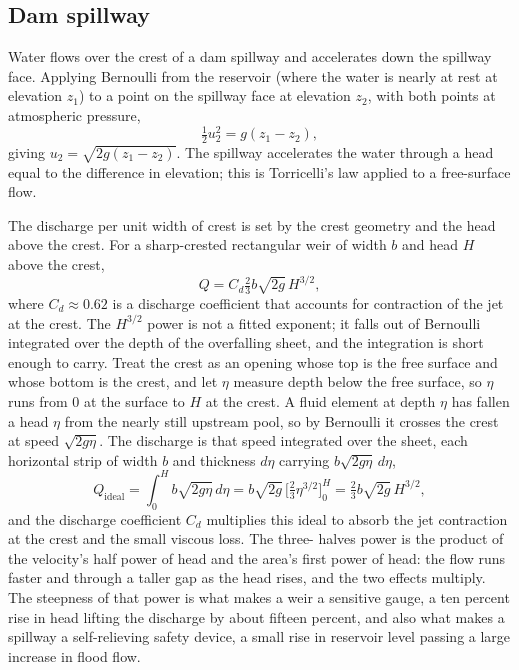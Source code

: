 \subsection{Dam spillway}

Water flows over the crest of a dam spillway and accelerates down
the spillway face. Applying Bernoulli from the reservoir (where the
water is nearly at rest at elevation $z_1$) to a point on the
spillway face at elevation $z_2$, with both points at atmospheric
pressure,
\[
\tfrac{1}{2} u_2^2 = g(z_1 - z_2),
\]
giving $u_2 = \sqrt{2g(z_1 - z_2)}$. The spillway accelerates the
water through a head equal to the difference in elevation; this is
Torricelli's law applied to a free-surface flow.

The discharge per unit width of crest is set by the crest geometry
and the head above the crest. For a sharp-crested rectangular weir
of width $b$ and head $H$ above the crest,
\[
Q = C_d \tfrac{2}{3} b\sqrt{2g}\,H^{3/2},
\]
where $C_d \approx 0.62$ is a discharge coefficient that accounts
for contraction of the jet at the crest. The $H^{3/2}$ power is not a
fitted exponent; it falls out of Bernoulli integrated over the depth of
the overfalling sheet, and the integration is short enough to carry.
Treat the crest as an opening whose top is the free surface and whose
bottom is the crest, and let $\eta$ measure depth below the free
surface, so $\eta$ runs from $0$ at the surface to $H$ at the crest. A
fluid element at depth $\eta$ has fallen a head $\eta$ from the nearly
still upstream pool, so by Bernoulli it crosses the crest at speed
$\sqrt{2g\eta}$. The discharge is that speed integrated over the sheet,
each horizontal strip of width $b$ and thickness $d\eta$ carrying
$b\sqrt{2g\eta}\,d\eta$,
\[
Q_\text{ideal} = \int_0^H b\sqrt{2g\eta}\,d\eta
= b\sqrt{2g}\,\Big[\tfrac{2}{3}\eta^{3/2}\Big]_0^H
= \tfrac{2}{3}b\sqrt{2g}\,H^{3/2},
\]
and the discharge coefficient $C_d$ multiplies this ideal to absorb the
jet contraction at the crest and the small viscous loss. The three-
halves power is the product of the velocity's half power of head and the
area's first power of head: the flow runs faster and through a taller
gap as the head rises, and the two effects multiply. The steepness of
that power is what makes a weir a sensitive gauge, a ten percent rise in
head lifting the discharge by about fifteen percent, and also what makes
a spillway a self-relieving safety device, a small rise in reservoir
level passing a large increase in flood flow.


